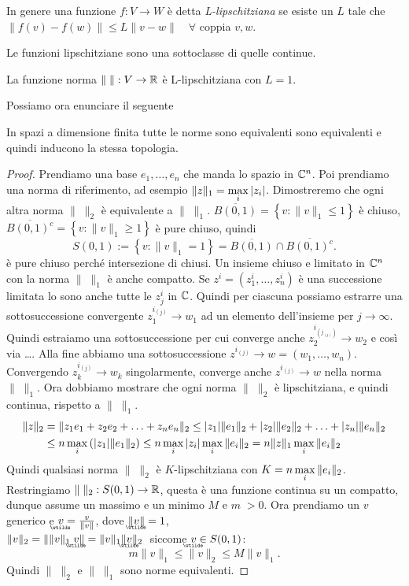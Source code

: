 \begin{definition}[L-lipschitzianità]
In genere una funzione $f:V \to W$ è detta \emph{L-lipschitziana} se esiste
un $L$ tale che $\|f(v) - f(w)\| \leq L\|v-w\| \quad \forall$ coppia $v,w$.
\end{definition}

Le funzioni lipschitziane sono una sottoclasse di quelle continue.
\begin{example}[lipschitziana]
La funzione norma $\| \; \|: V \to \mathbb R$ è L-lipschitziana con $L = 1$.
\end{example}

Possiamo ora enunciare il seguente
\begin{theorem}
In spazi a dimensione finita tutte le norme sono equivalenti sono equivalenti
e quindi inducono la stessa topologia.
\end{theorem}
\begin{proof}
Prendiamo una base $e_1, \ldots, e_n$ che manda lo spazio in $\mathbb C^n$.
Poi prendiamo una norma di riferimento, ad esempio 
$\displaystyle \|z\|_1 = \max_i {\left|z_i\right|}$. Dimostreremo che ogni altra norma $\| \; \|_2$ 
è equivalente a $\| \; \|_1$. $\overline{B(0, 1)} = 
\left\{v: \|v\|_1 \leq 1 \right\} $ è chiuso, 
$\overline{{B(0, 1)}^c} = \left\{v: \|v\|_1 \geq 1 \right\} $ è pure chiuso,
quindi
\[
S(0, 1) := \left\{v: \|v\|_1 = 1\right\} = 
\overline{B(0, 1)} \cap \overline{{B(0,1)}^c}
.\] 
è pure chiuso perché intersezione di chiusi.
Un insieme chiuso e limitato in $\mathbb C^n$ con la norma $\| \; \|_1$ è anche
compatto. Se $z^i = \left(z_1^i, \ldots, z_n^i \right)$ è una successione
limitata lo sono anche tutte le $z_j^i$ in $\mathbb C$. Quindi per ciascuna possiamo
estrarre una sottosuccessione convergente $z_1^{i_{(j)}} \to w_1$ ad un
elemento dell'insieme per $j \to \infty$. Quindi estraiamo una
sottosuccessione per cui converge anche $z_2^{i_{(j_{(t)})}} \to w_2$ e così
via \ldots. Alla fine abbiamo una sottosuccessione 
$z^{i_{(j)}} \to w = \left(w_1, \ldots, w_n \right)$. Convergendo 
$z_k^{i_{(j)}} \to w_k$ singolarmente, converge anche $z^{i_{(j)}} \to w$
nella norma $\| \; \|_1$.
Ora dobbiamo mostrare che ogni norma $\| \; \|_2$ è lipschitziana, e quindi
continua, rispetto a $\| \; \|_1$.
\begin{align*}
\|z\|_2 &= \|z_1e_1 + z_2e_2 + \ldots + z_ne_n\|_2 
\leq {\left|z_1\right|}\|e_1\|_2 + {\left|z_2\right|}\|e_2\|_2 + \ldots + {\left|z_n\right|}\|e_n\|_2 \\
&\leq n \max_i \left({\left|z_1\right|}\|e_1\|_2 \right) 
\leq n \max_i {\left|z_i\right|} \max_i \|e_i\|_2 = n \|z\|_1 \max_i \|e_i\|_2 
\end{align*}
Quindi qualsiasi norma $\| \; \|_2$ è $K$-lipschitziana con 
$\displaystyle K = n \max_i \|e_i\|_2$.
Restringiamo $\| \; \|_2 : S(0, 1) \to \mathbb R$, questa è una funzione continua
su un compatto, dunque assume un massimo e un minimo $M$ e $m \; > 0$.
Ora prendiamo un $v$ generico e $\utld{v} = \frac{v}{\|v\|}$, dove 
$\|\utld{v}\| = 1$,\\
$\|v\|_2 = \| \|v\|_1 \; \utld{v} \| = \|v\|_1 \|\utld{v}\|_2 \;$ siccome
$\utld{v} \in S(0, 1)$:
\[
m \|v\|_1 \leq \|v\|_2 \leq M \|v\|_1
.\] 
Quindi $\| \; \|_2$ e $\| \; \|_1$ sono norme equivalenti.
\end{proof}

